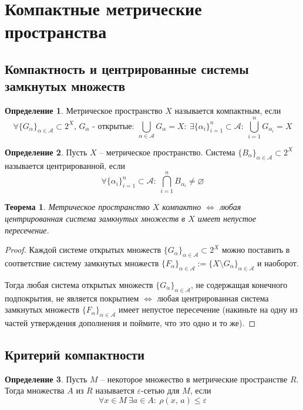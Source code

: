 \documentclass[a4paper,12pt]{article}
\renewcommand{\leq}{\ensuremath{\leqslant}}
\renewcommand{\emptyset}{\ensuremath{\varnothing}}
\theoremstyle{plain}
\newtheorem{theorem}{Теорема}[section]
\theoremstyle{definition}
\newtheorem{definition}{Определение}[section]
\theoremstyle{remark}
\begin{document}
\section{Компактные метрические пространства}
\subsection{Компактность и центрированные системы замкнутых множеств}
\begin{definition}
	Метрическое пространство $X$ называется компактным, если
	\[
		\forall \{G_\alpha\}_{\alpha \in \mathcal{A}} \subset 2^X,\, G_\alpha \text{ - открытые} :\: \bigcup_{\alpha \in \mathcal{A}} G_\alpha = X :\: \exists \{\alpha_i\}_{i = 1}^n \subset \mathcal{A} :\: \bigcup_{i = 1}^n G_{\alpha_i} = X
	\]
\end{definition}

\begin{definition}
	Пусть $X$ -- метрическое пространство. Система $\{B_\alpha\}_{\alpha \in \mathcal{A}} \subset 2^X$ называется центрированной, если
	\[
		\forall \{\alpha_i\}_{i=1}^n \subset \mathcal{A} :\: \bigcap_{i = 1}^n B_{\alpha_i} \neq \emptyset
	\]
\end{definition}

\begin{theorem}
	Метрическое пространство $X$ компактно $\Leftrightarrow$ любая центрированная система замкнутых множеств в $X$ имеет непустое пересечение.
\end{theorem}

\begin{proof}
	Каждой системе открытых множеств $\{G_\alpha\}_{\alpha \in \mathcal{A}} \subset 2^X$ можно поставить в соответствие систему замкнутых множеств $\{F_\alpha\}_{\alpha \in \mathcal{A}} := \{X \setminus G_\alpha\}_{\alpha \in \mathcal{A}}$ и наоборот.

	Тогда любая система открытых множеств $\{G_\alpha\}_{\alpha \in \mathcal{A}}$, не содержащая конечного подпокрытия, не является покрытием $\Leftrightarrow$ любая центрированная система замкнутых множеств $\{F_\alpha\}_{\alpha \in \mathcal{A}}$ имеет непустое пересечение (накиньте на одну из частей утверждения дополнения и поймите, что это одно и то же).
\end{proof}

\subsection{Критерий компактности}
\begin{definition}
	Пусть $M$ -- некоторое множество в метрические пространстве $R$. Тогда множества $A$ из $R$ называется $\varepsilon$-сетью для $M$, если
	\[
		\forall x \in M \: \exists a \in A :\: \rho(x,\, a) \leq \varepsilon
	\]
\end{definition}
\end{document}

